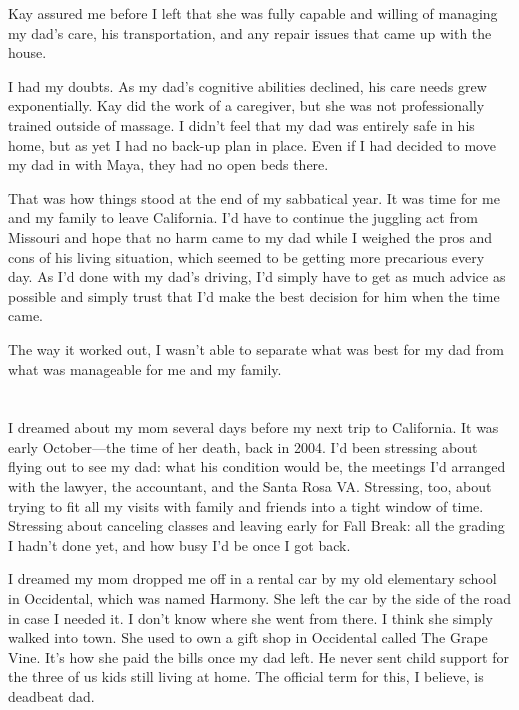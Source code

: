 \documentclass[12pt]{book}
\begin{document}
Kay assured me before I left that she was fully capable and willing of managing my dad's care, his transportation, and any repair issues that came up with the house.

I had my doubts. As my dad's cognitive abilities declined, his care needs grew exponentially. Kay did the work of a caregiver, but she was not professionally trained outside of massage. I didn't feel that my dad was entirely safe in his home, but as yet I had no back-up plan in place. Even if I had decided to move my dad in with Maya, they had no open beds there.

That was how things stood at the end of my sabbatical year. It was time for me and my family to leave California. I'd have to continue the juggling act from Missouri and hope that no harm came to my dad while I weighed the pros and cons of his living situation, which seemed to be getting more precarious every day. As I'd done with my dad's driving, I'd simply have to get as much advice as possible and simply trust that I'd make the best decision for him when the time came.

The way it worked out, I wasn't able to separate what was best for my dad from what was manageable for me and my family. 


\chapter{}

I dreamed about my mom several days before my next trip to California. It was early October---the time of her death, back in 2004. I'd been stressing about flying out to see my dad: what his condition would be, the meetings I'd arranged with the lawyer, the accountant, and the Santa Rosa VA. Stressing, too, about trying to fit all my visits with family and friends into a tight window of time. Stressing about canceling classes and leaving early for Fall Break: all the grading I hadn't done yet, and how busy I'd be once I got back.

I dreamed my mom dropped me off in a rental car by my old elementary school in Occidental, which was named Harmony. She left the car by the side of the road in case I needed it. I don't know where she went from there. I think she simply walked into town. She used to own a gift shop in Occidental called The Grape Vine. It's how she paid the bills once my dad left. He never sent child support for the three of us kids still living at home. The official term for this, I believe, is deadbeat dad.
\end{document}
